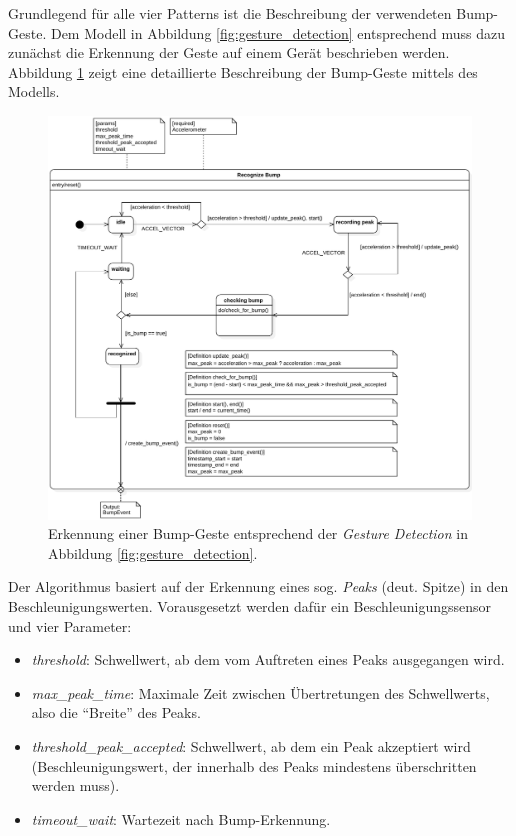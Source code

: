 Grundlegend für alle vier Patterns ist die Beschreibung der verwendeten Bump-Geste. Dem Modell in Abbildung \ref{fig:gesture_detection} entsprechend muss dazu zunächst die Erkennung der Geste auf einem Gerät beschrieben werden. Abbildung \ref{fig:bump_recognize} zeigt eine detaillierte Beschreibung der Bump-Geste mittels des Modells.
\begin{figure}[h]
\centering
\includegraphics[width=1\textwidth]{bilder/bump/recognize}
\caption{Erkennung einer Bump-Geste entsprechend der \textit{Gesture Detection} in Abbildung \ref{fig:gesture_detection}.}
\label{fig:bump_recognize}
\end{figure}

Der Algorithmus basiert auf der Erkennung eines sog. \textit{Peaks} (deut. Spitze) in den Beschleunigungswerten. Vorausgesetzt werden dafür ein Beschleunigungssensor und vier Parameter:
\begin{itemize}
\item \textit{threshold}: Schwellwert, ab dem vom Auftreten eines Peaks ausgegangen wird.
\item \textit{max\_peak\_time}: Maximale Zeit zwischen Übertretungen des Schwellwerts, also die "`Breite"' des Peaks.
\item \textit{threshold\_peak\_accepted}: Schwellwert, ab dem ein Peak akzeptiert wird (Beschleunigungswert, der innerhalb des Peaks mindestens überschritten werden muss).
\item \textit{timeout\_wait}: Wartezeit nach Bump-Erkennung.
\end{itemize}

